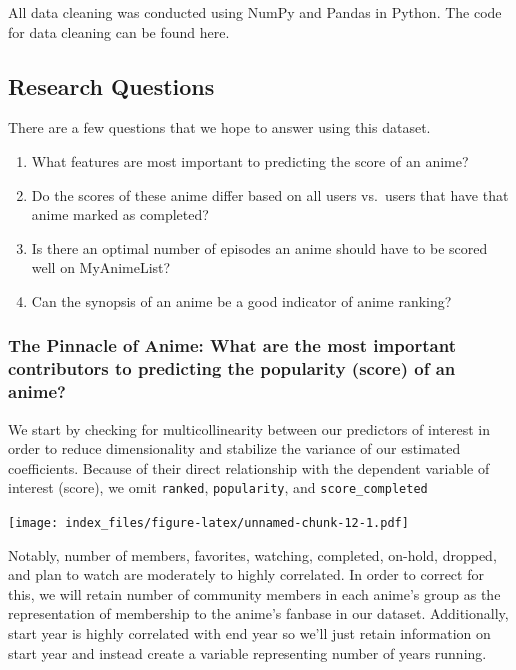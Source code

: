 \documentclass[
]{article}
\begin{document}
All data cleaning was conducted using NumPy and Pandas in Python. The
code for data cleaning can be found here.

\hypertarget{research-questions}{%
\subsection{Research Questions}\label{research-questions}}

There are a few questions that we hope to answer using this dataset.

\begin{enumerate}
\def\labelenumi{\arabic{enumi})}
\item
  What features are most important to predicting the score of an anime?
\item
  Do the scores of these anime differ based on all users vs.~users that
  have that anime marked as completed?
\item
  Is there an optimal number of episodes an anime should have to be
  scored well on MyAnimeList?
\item
  Can the synopsis of an anime be a good indicator of anime ranking?
\end{enumerate}

\hypertarget{the-pinnacle-of-anime-what-are-the-most-important-contributors-to-predicting-the-popularity-score-of-an-anime}{%
\subsubsection{The Pinnacle of Anime: What are the most important
contributors to predicting the popularity (score) of an
anime?}\label{the-pinnacle-of-anime-what-are-the-most-important-contributors-to-predicting-the-popularity-score-of-an-anime}}

We start by checking for multicollinearity between our predictors of
interest in order to reduce dimensionality and stabilize the variance of
our estimated coefficients. Because of their direct relationship with
the dependent variable of interest (score), we omit \texttt{ranked},
\texttt{popularity}, and \texttt{score\_completed}

\texttt{[image: index\_files/figure-latex/unnamed-chunk-12-1.pdf]}

Notably, number of members, favorites, watching, completed, on-hold,
dropped, and plan to watch are moderately to highly correlated. In order
to correct for this, we will retain number of community members in each
anime's group as the representation of membership to the anime's fanbase
in our dataset. Additionally, start year is highly correlated with end
year so we'll just retain information on start year and instead create a
variable representing number of years running.
\end{document}
